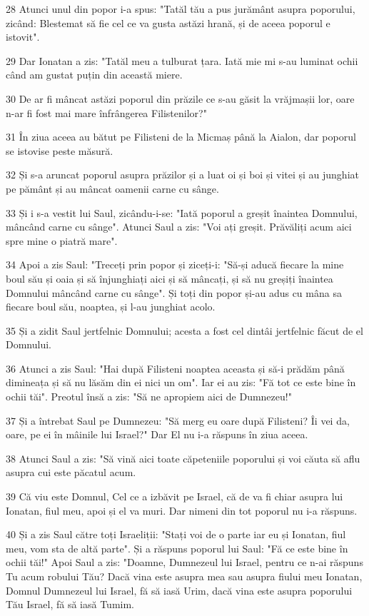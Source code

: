 \par 28 Atunci unul din popor i-a spus: "Tatăl tău a pus jurământ asupra poporului, zicând: Blestemat să fie cel ce va gusta astăzi hrană, și de aceea poporul e istovit".
\par 29 Dar Ionatan a zis: "Tatăl meu a tulburat țara. Iată mie mi s-au luminat ochii când am gustat puțin din această miere.
\par 30 De ar fi mâncat astăzi poporul din prăzile ce s-au găsit la vrăjmașii lor, oare n-ar fi fost mai mare înfrângerea Filistenilor?"
\par 31 În ziua aceea au bătut pe Filisteni de la Micmaș până la Aialon, dar poporul se istovise peste măsură.
\par 32 Și s-a aruncat poporul asupra prăzilor și a luat oi și boi și vitei și au junghiat pe pământ și au mâncat oamenii carne cu sânge.
\par 33 Și i s-a vestit lui Saul, zicându-i-se: "Iată poporul a greșit înaintea Domnului, mâncând carne cu sânge". Atunci Saul a zis: "Voi ați greșit. Prăvăliți acum aici spre mine o piatră mare".
\par 34 Apoi a zis Saul: "Treceți prin popor și ziceți-i: "Să-și aducă fiecare la mine boul său și oaia și să înjunghiați aici și să mâncați, și să nu greșiți înaintea Domnului mâncând carne cu sânge". Și toți din popor și-au adus cu mâna sa fiecare boul său, noaptea, și l-au junghiat acolo.
\par 35 Și a zidit Saul jertfelnic Domnului; acesta a fost cel dintâi jertfelnic făcut de el Domnului.
\par 36 Atunci a zis Saul: "Hai după Filisteni noaptea aceasta și să-i prădăm până dimineața și să nu lăsăm din ei nici un om". Iar ei au zis: "Fă tot ce este bine în ochii tăi". Preotul însă a zis: "Să ne apropiem aici de Dumnezeu!"
\par 37 Și a întrebat Saul pe Dumnezeu: "Să merg eu oare după Filisteni? Îi vei da, oare, pe ei în mâinile lui Israel?" Dar El nu i-a răspuns în ziua aceea.
\par 38 Atunci Saul a zis: "Să vină aici toate căpeteniile poporului și voi căuta să aflu asupra cui este păcatul acum.
\par 39 Că viu este Domnul, Cel ce a izbăvit pe Israel, că de va fi chiar asupra lui Ionatan, fiul meu, apoi și el va muri. Dar nimeni din tot poporul nu i-a răspuns.
\par 40 Și a zis Saul către toți Israeliții: "Stați voi de o parte iar eu și Ionatan, fiul meu, vom sta de altă parte". Și a răspuns poporul lui Saul: "Fă ce este bine în ochii tăi!" Apoi Saul a zis: "Doamne, Dumnezeul lui Israel, pentru ce n-ai răspuns Tu acum robului Tău? Dacă vina este asupra mea sau asupra fiului meu Ionatan, Domnul Dumnezeul lui Israel, fă să iasă Urim, dacă vina este asupra poporului Tău Israel, fă să iasă Tumim.
